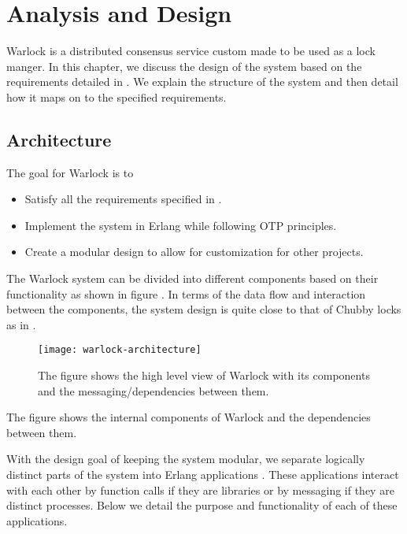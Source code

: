 \chapter{Analysis and Design}
\label{chapter:analysis.design}

Warlock is a distributed consensus service custom made to be used as a
lock manger. In this chapter, we discuss the design of the system based on the
requirements detailed in . We explain the structure
of the system and then detail how it maps on to the specified requirements.

\section{Architecture}

The goal for Warlock is to

\begin{itemize}
  \item Satisfy all the requirements specified in .
  \item Implement the system in Erlang while following OTP principles.
  \item Create a modular design to allow for customization for other projects.
\end{itemize}

The Warlock system can be divided into different components based on their
functionality as shown in figure . In terms of the
data flow and interaction between the components, the system design is quite
close to that of Chubby locks \citep{Burrows06} as in
.

\begin{figure}
  \begin{whole}
  \texttt{[image: warlock-architecture]}
  \caption[Warlock Architecture]{%
    The figure shows the high level view of Warlock with its components and the
    messaging/dependencies between them.}
    \label{figure:warlock.arch}
  \normalcaption
  \end{whole}
\end{figure}

The figure shows the internal components of Warlock and the dependencies between
them.

With the design goal of keeping the system modular, we separate logically 
distinct parts of the system into Erlang applications .
These applications interact with each other by function calls if they are 
libraries or by messaging if they are distinct processes. Below we detail the
purpose and functionality of each of these applications.

